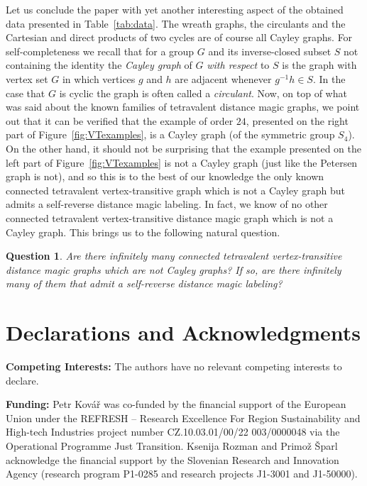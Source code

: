 \documentclass[11 pt,english]{article}
\newtheorem{question}[theorem]{Question}
\theoremstyle{definition}
\begin{document}
Let us conclude the paper with yet another interesting aspect of the obtained data presented in Table~\ref{tab:data}. The wreath graphs, the circulants and the Cartesian and direct products of two cycles are of course all Cayley graphs. For self-completeness we recall that for a group $G$ and its inverse-closed subset $S$ not containing the identity the {\em Cayley graph} of $G$ {\em with respect} to $S$ is the graph with vertex set $G$ in which vertices $g$ and $h$ are adjacent whenever $g^{-1}h \in S$. In the case that $G$ is cyclic the graph is often called a {\em circulant}. Now, on top of what was said about the known families of tetravalent distance magic graphs, we point out that it can be verified that the example of order $24$, presented on the right part of Figure~\ref{fig:VTexamples}, is a Cayley graph (of the symmetric group $S_4$). On the other hand, it should not be surprising that the example presented on the left part of Figure~\ref{fig:VTexamples} is not a Cayley graph (just like the Petersen graph is not), and so this is to the best of our knowledge the only known connected tetravalent vertex-transitive graph which is not a Cayley graph but admits a self-reverse distance magic labeling. In fact, we know of no other connected tetravalent vertex-transitive distance magic graph which is not a Cayley graph. This brings us to the following natural question.

\begin{question}
\label{que:VTnCay}
Are there infinitely many connected tetravalent vertex-transitive distance magic graphs which are not Cayley graphs? If so, are there infinitely many of them that admit a self-reverse distance magic labeling?
\end{question} 


\section*{Declarations and Acknowledgments}

\noindent
{\bf Competing Interests:} The authors have no relevant competing interests to declare.
\bigskip

\noindent
{\bf Funding:} Petr Kov\'{a}\v{r} was co-funded by the financial support of the European Union under the REFRESH -- Research Excellence For Region Sustainability and High-tech Industries project number CZ.10.03.01/00/22 003/0000048 via the Operational Programme Just Transition. Ksenija Rozman and Primo\v z \v Sparl acknowledge the financial support by the Slovenian Research and Innovation Agency (research program P1-0285 and research projects J1-3001 and J1-50000).
\end{document}
